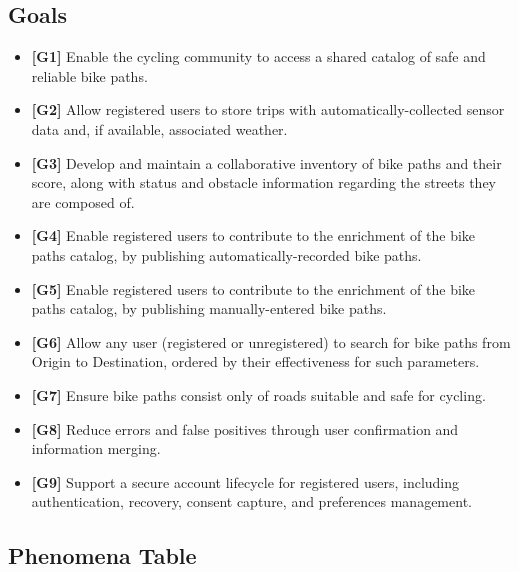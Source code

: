 \documentclass{Configuration_Files/PoliMi3i_thesis}
\begin{document}
\subsection{Goals}
\begin{itemize}
    \item \textbf{[G1]} Enable the cycling community to access a shared catalog of safe and reliable bike paths.
	\item \textbf{[G2]} Allow registered users to store trips with automatically-collected sensor data and, if available, associated weather.
	\item \textbf{[G3]} Develop and maintain a collaborative inventory of bike paths and their score, along with status and obstacle information regarding the streets they are composed of.
	\item \textbf{[G4]} Enable registered users to contribute to the enrichment of the bike paths catalog, by publishing automatically-recorded bike paths.
	\item \textbf{[G5]} Enable registered users to contribute to the enrichment of the bike paths catalog, by publishing manually-entered bike paths.
	\item \textbf{[G6]} Allow any user (registered or unregistered) to search for bike paths from Origin to Destination, ordered by their effectiveness for such parameters.
	\item \textbf{[G7]} Ensure bike paths consist only of roads suitable and safe for cycling.
	\item \textbf{[G8]} Reduce errors and false positives through user confirmation and information merging.
    \item \textbf{[G9]} Support a secure account lifecycle for registered users, including authentication, recovery, consent capture, and preferences management.
\end{itemize}

\subsection{Phenomena Table}
\end{document}
